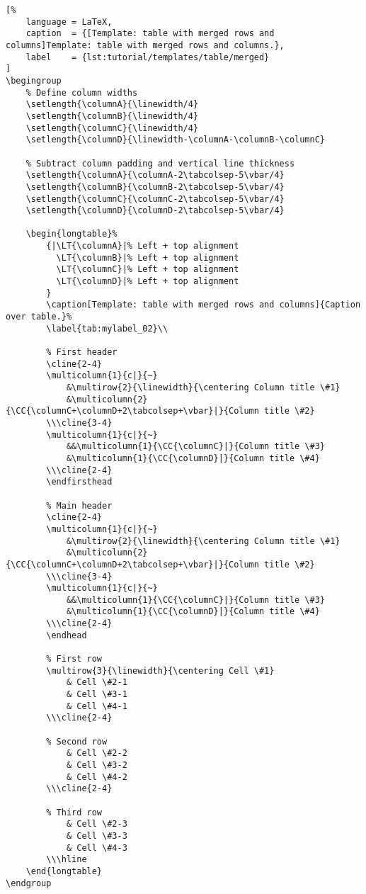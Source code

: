 \begin{lstlisting}[%
    language = LaTeX,
    caption  = {[Template: table with merged rows and columns]Template: table with merged rows and columns.},
    label    = {lst:tutorial/templates/table/merged}
]
\begingroup
    % Define column widths
    \setlength{\columnA}{\linewidth/4}
    \setlength{\columnB}{\linewidth/4}
    \setlength{\columnC}{\linewidth/4}
    \setlength{\columnD}{\linewidth-\columnA-\columnB-\columnC}
    
    % Subtract column padding and vertical line thickness
    \setlength{\columnA}{\columnA-2\tabcolsep-5\vbar/4}
    \setlength{\columnB}{\columnB-2\tabcolsep-5\vbar/4}
    \setlength{\columnC}{\columnC-2\tabcolsep-5\vbar/4}
    \setlength{\columnD}{\columnD-2\tabcolsep-5\vbar/4}
    
    \begin{longtable}%
        {|\LT{\columnA}|% Left + top alignment
          \LT{\columnB}|% Left + top alignment
          \LT{\columnC}|% Left + top alignment
          \LT{\columnD}|% Left + top alignment
        }
        \caption[Template: table with merged rows and columns]{Caption over table.}%
        \label{tab:mylabel_02}\\
        
        % First header
        \cline{2-4}
        \multicolumn{1}{c|}{~}
            &\multirow{2}{\linewidth}{\centering Column title \#1}
            &\multicolumn{2}{\CC{\columnC+\columnD+2\tabcolsep+\vbar}|}{Column title \#2}
        \\\cline{3-4}
        \multicolumn{1}{c|}{~}
            &&\multicolumn{1}{\CC{\columnC}|}{Column title \#3}
            &\multicolumn{1}{\CC{\columnD}|}{Column title \#4}
        \\\cline{2-4}
        \endfirsthead
        
        % Main header
        \cline{2-4}
        \multicolumn{1}{c|}{~}
            &\multirow{2}{\linewidth}{\centering Column title \#1}
            &\multicolumn{2}{\CC{\columnC+\columnD+2\tabcolsep+\vbar}|}{Column title \#2}
        \\\cline{3-4}
        \multicolumn{1}{c|}{~}
            &&\multicolumn{1}{\CC{\columnC}|}{Column title \#3}
            &\multicolumn{1}{\CC{\columnD}|}{Column title \#4}
        \\\cline{2-4}
        \endhead
        
        % First row
        \multirow{3}{\linewidth}{\centering Cell \#1}
            & Cell \#2-1
            & Cell \#3-1
            & Cell \#4-1
        \\\cline{2-4}
        
        % Second row
            & Cell \#2-2
            & Cell \#3-2
            & Cell \#4-2
        \\\cline{2-4}
        
        % Third row
            & Cell \#2-3
            & Cell \#3-3
            & Cell \#4-3
        \\\hline
    \end{longtable}
\endgroup
\end{lstlisting}

